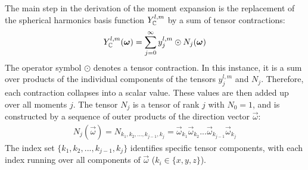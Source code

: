 The main step in the derivation of the moment expansion is the replacement of the spherical harmonics basis function $Y_{\mathbb{C}}^{l,m}$ by a sum of tensor contractions:
\begin{align}
\label{eq:fld_moment_expansion_sum}
Y_{\mathbb{C}}^{l,m}(\boldsymbol{\mathbf{\omega}}) =
\sum_{j=0}^\infty{y^{l,m}_j\odot N_j(\boldsymbol{\mathbf{\omega}})}
\end{align}
The operator symbol $\odot$ denotes a tensor contraction. In this instance, it is a sum over products of the individual components of the tensors $y^{l,m}_j$ and $N_j$. Therefore, each contraction collapses into a scalar value. These values are then added up over all moments $j$. The tensor $N_j$ is a tensor of rank $j$ with $N_0=1$, and is constructed by a sequence of outer products of the direction vector $\vec{\omega}$:
\begin{align}
N_j\left(\vec{\omega}\right)
=N_{k_1, k_2, ..., k_{j-1}, k_j} 
=\vec{\omega}_{k_1}\vec{\omega}_{k_2}...\vec{\omega}_{k_{j-1}}\vec{\omega}_{k_j} 
\end{align}
The index set $\{k_1, k_2, ..., k_{j-1}, k_j\}$ identifies specific tensor components, with each index running over all components of $\vec{\omega}$ ($k_i \in \{x, y, z\}$).

